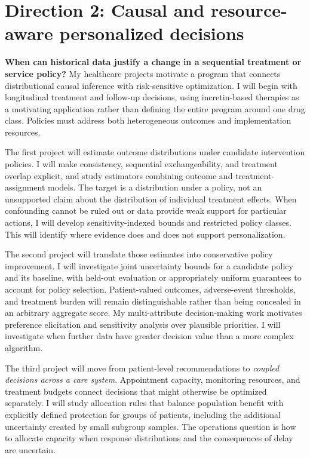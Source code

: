 \documentclass[11pt,letterpaper]{article}
\begin{document}
\section{Direction 2: Causal and resource-aware personalized decisions}

\textbf{When can historical data justify a change in a sequential treatment
or service policy?} My healthcare projects motivate a program that connects
distributional causal inference with risk-sensitive optimization. I will
begin with longitudinal treatment and follow-up decisions, using
incretin-based therapies as a motivating application rather than defining
the entire program around one drug class. Policies must address both
heterogeneous outcomes and implementation resources.

The first project will estimate outcome distributions under candidate
intervention policies. I will make consistency, sequential exchangeability,
and treatment overlap explicit, and study estimators combining outcome and
treatment-assignment models. The target is a distribution under a policy,
not an unsupported claim about the distribution of individual treatment
effects. When confounding cannot be ruled out or data provide weak support
for particular actions, I will develop sensitivity-indexed bounds and
restricted policy classes. This will identify where evidence does and
does not support personalization.

The second project will translate those estimates into conservative policy
improvement. I will investigate joint uncertainty bounds for a candidate
policy and its baseline, with held-out evaluation or appropriately uniform
guarantees to account for policy selection. Patient-valued outcomes,
adverse-event thresholds, and treatment burden will remain distinguishable
rather than being concealed in an arbitrary aggregate score. My
multi-attribute decision-making work motivates preference elicitation and
sensitivity analysis over plausible priorities. I will investigate when
further data have greater decision value than a more complex algorithm.

The third project will move from patient-level recommendations to
\emph{coupled decisions across a care system}. Appointment capacity,
monitoring resources, and treatment budgets connect decisions that might
otherwise be optimized separately. I will study allocation rules that
balance population benefit with explicitly defined protection for groups
of patients, including the additional uncertainty created by small
subgroup samples. The operations question is how to allocate capacity
when response distributions and the consequences of delay are uncertain.
\end{document}
